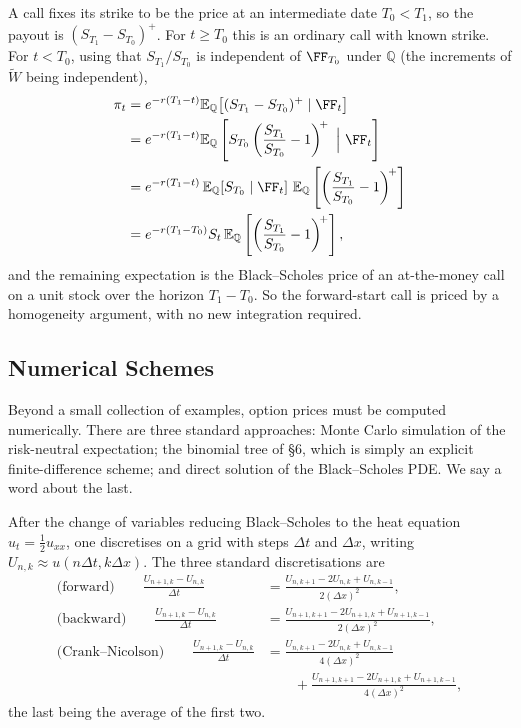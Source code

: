 \documentclass[a4paper]{scrartcl}
\newcommand{\QQ}{\mathbb{Q}}
\begin{document}
\begin{example}
	A  call fixes its strike to be the price at an intermediate date $T_0 < T_1$, so the payout is $(S_{T_1}-S_{T_0})^+$. For $t\geq T_0$ this is an ordinary call with known strike. For $t<T_0$, using that $S_{T_1}/S_{T_0}$ is independent of $\FF_{T_0}$ under $\QQ$ (the increments of $\tilde W$ being independent),
	\begin{align*}
		\pi_t &= e^{-r(T_1-t)}\EE_\QQ\big[(S_{T_1}-S_{T_0})^+\mid\FF_t\big]\\
		&= e^{-r(T_1-t)}\EE_\QQ\left[S_{T_0}\left(\frac{S_{T_1}}{S_{T_0}} - 1\right)^{\!+}\ \Big|\ \FF_t\right]\\
		&= e^{-r(T_1-t)}\,\EE_\QQ[S_{T_0}\mid\FF_t]\ \EE_\QQ\left[\left(\frac{S_{T_1}}{S_{T_0}}-1\right)^{\!+}\right]\\
		&= e^{-r(T_1 - T_0)}S_t\,\EE_\QQ\left[\left(\frac{S_{T_1}}{S_{T_0}}-1\right)^{\!+}\right],
	\end{align*}
	and the remaining expectation is the Black--Scholes price of an at-the-money call on a unit stock over the horizon $T_1 - T_0$. So the forward-start call is priced by a homogeneity argument, with no new integration required.
\end{example}

\subsection{Numerical Schemes}

Beyond a small collection of examples, option prices must be computed numerically. There are three standard approaches: Monte Carlo simulation of the risk-neutral expectation; the binomial tree of \S6, which is simply an explicit finite-difference scheme; and direct solution of the Black--Scholes PDE. We say a word about the last.

After the change of variables reducing Black--Scholes to the heat equation $u_t = \tfrac12u_{xx}$, one discretises on a grid with steps $\Delta t$ and $\Delta x$, writing $U_{n,k}\approx u(n\Delta t, k\Delta x)$. The three standard discretisations are
\begin{align*}
	\text{(forward)}\qquad \frac{U_{n+1,k}-U_{n,k}}{\Delta t} &= \frac{U_{n,k+1}-2U_{n,k}+U_{n,k-1}}{2(\Delta x)^2},\\
	\text{(backward)}\qquad\frac{U_{n+1,k}-U_{n,k}}{\Delta t} &= \frac{U_{n+1,k+1}-2U_{n+1,k}+U_{n+1,k-1}}{2(\Delta x)^2},\\
	\text{(Crank--Nicolson)}\qquad \frac{U_{n+1,k}-U_{n,k}}{\Delta t} &= \frac{U_{n,k+1}-2U_{n,k}+U_{n,k-1}}{4(\Delta x)^2}\\
	&\qquad{}+ \frac{U_{n+1,k+1}-2U_{n+1,k}+U_{n+1,k-1}}{4(\Delta x)^2},
\end{align*}
the last being the average of the first two.
\end{document}
